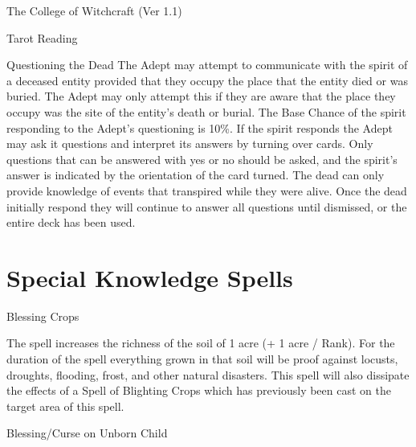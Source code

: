 \begin{Chapter}{The College of Witchcraft (Ver 1.1)}
\begin{ritual}[Q-2]{Tarot Reading }
\begin{effects}
Questioning  the  Dead  The  Adept  may  attempt  to 
communicate  with  the  spirit  of  a  deceased  entity 
provided that they occupy the place that the entity 
died  or  was  buried.  The  Adept  may  only  attempt 
this  if  they  are  aware  that  the  place  they  occupy 
was  the  site  of  the  entity’s  death  or  burial.  The 
Base Chance of the spirit responding to the Adept’s 
questioning is 10\%. If the spirit responds the Adept 
may  ask  it  questions  and  interpret  its  answers  by 
turning  over  cards.  Only  questions  that  can  be 
answered  with  yes  or  no  should  be  asked,  and  the 
spirit’s answer is indicated by the orientation of the 
card turned. The dead can only provide knowledge 
of  events  that  transpired  while  they  were  alive. 
Once  the  dead  initially  respond  they  will  continue 
to  answer  all  questions  until  dismissed,  or  the 
entire deck has been used. 


\end{effects}
\end{ritual}

\section{Special Knowledge Spells}

\begin{spell}[S-1]{Blessing Crops }

\begin{effects}
The spell increases the richness of the soil 
of 1 acre (+ 1 acre / Rank). For the duration of the 
spell  everything  grown  in  that  soil  will  be  proof 
against locusts, droughts, flooding, frost, and other 
natural  disasters.  This  spell  will  also  dissipate  the 
effects  of  a  Spell  of  Blighting  Crops  which  has 
previously been cast on the target area of this spell.
\end{effects}
\end{spell}

\begin{spell}[S-2]{Blessing/Curse on Unborn Child}


\end{spell}
\end{Chapter}
